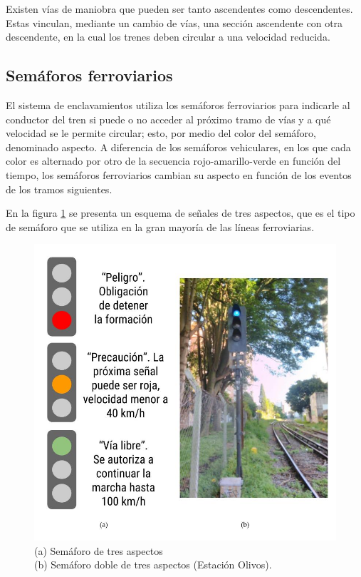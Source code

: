 			Existen vías de maniobra que pueden ser tanto ascendentes como descendentes. Estas vinculan, mediante un cambio de vías, una sección ascendente con otra descendente, en la cual los trenes deben circular a una velocidad reducida.
			
		\subsection{Semáforos ferroviarios}
			
			El sistema de enclavamientos utiliza los semáforos ferroviarios para indicarle al conductor del tren si puede o no acceder al próximo tramo de vías y a qué velocidad se le permite circular; esto, por medio del color del semáforo, denominado aspecto. A diferencia de los semáforos vehiculares, en los que cada color es alternado por otro de la secuencia rojo-amarillo-verde en función del tiempo, los semáforos ferroviarios cambian su aspecto en función de los eventos de los tramos siguientes.
					
			En la figura \ref{fig:Sem_3Aspectos} se presenta un esquema de señales de tres aspectos, que es el tipo de semáforo que se utiliza en la gran mayoría de las líneas ferroviarias.
						 	
			 \begin{figure}[htbp!]
				\centering
				\includegraphics[scale=.28]{./Figures/Sem3}
				\caption{(a) Semáforo de tres aspectos\\(b) Semáforo doble de tres aspectos (Estación Olivos).}
				\label{fig:Sem_3Aspectos}
			\end{figure}
			

